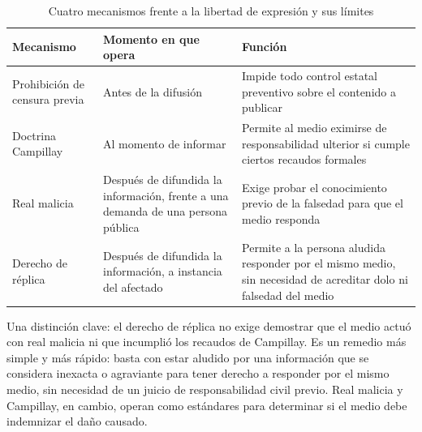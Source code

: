 \documentclass[12pt,oneside]{book}
\begin{document}
\begin{table}[H]
\centering
\caption{Cuatro mecanismos frente a la libertad de expresión y sus límites}
\begin{tabularx}{\textwidth}{@{}lXX@{}}
\toprule
\textbf{Mecanismo} & \textbf{Momento en que opera} & \textbf{Función} \\
\midrule
Prohibición de censura previa & Antes de la difusión & Impide todo control
estatal preventivo sobre el contenido a publicar \\
Doctrina Campillay & Al momento de informar & Permite al medio eximirse de
responsabilidad ulterior si cumple ciertos recaudos formales \\
Real malicia & Después de difundida la información, frente a una demanda de una
persona pública & Exige probar el conocimiento previo de la falsedad para que el
medio responda \\
Derecho de réplica & Después de difundida la información, a instancia del
afectado & Permite a la persona aludida responder por el mismo medio, sin
necesidad de acreditar dolo ni falsedad del medio \\
\bottomrule
\end{tabularx}
\end{table}

\begin{impbox}
Una distinción clave: el derecho de réplica no exige demostrar que el medio actuó
con real malicia ni que incumplió los recaudos de Campillay. Es un remedio más
simple y más rápido: basta con estar aludido por una información que se
considera inexacta o agraviante para tener derecho a responder por el mismo
medio, sin necesidad de un juicio de responsabilidad civil previo. Real malicia y
Campillay, en cambio, operan como estándares para determinar si el medio debe
indemnizar el daño causado.
\end{impbox}
\end{document}
